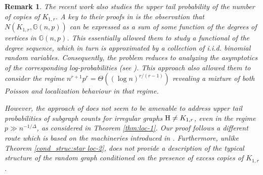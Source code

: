 \documentclass[a4paper,11pt,english,reqno]{amsart}
\numberwithin{equation}{section}
\renewcommand{\geq}{\geqslant}
\newcommand{\uH}{\textup{H}}
\newcommand{\G}{\mathbb{G}}
\newtheorem{theorem}{Theorem}[section]
\newtheorem{remark}[theorem]{Remark}
\newcommand{\blue}[1]{{\color{blue} #1}}
\newcommand{\purple}[1]{{\color{purple} #1}}
\begin{document}
	
	\begin{remark}
		The recent work \cite{AS25} also studies the upper tail probability of the number of copies of $K_{1,r}$.%
		 A key to their proofs in \cite{AS25} is the observation that $N(K_{1,r}, \G(n,p))$ can be expressed as a sum of some function of the degrees of vertices in $\G(n,p)$. This essentially allowed them to study a functional of the degree sequence, which in turn is approximated by a collection of i.i.d. binomial random variables. Consequently, the problem reduces to analyzing the asymptotics of the corresponding log-probabilities (see \cite[Lemma~4.2]{AS25}). This approach also allowed them to consider the regime $n^{r+1}p^r =\Theta ((\log n)^{r/(r-1)})$ revealing a mixture of both Poisson and localization behaviour in that regime.
		
		
		
		
		However, the approach of \cite{AS25} does not seem to be amenable to address upper tail probabilities of subgraph counts for irregular graphs $\uH \ne K_{1,r}$, even in the regime $p \gg n^{-1/\Delta}$, as considered in Theorem \ref{thm:loc-1}. 
		Our proof follows a different route which is based on the machineries introduced in \cite{HMS, ABRB}. Furthermore, unlike Theorem \ref{cond_struc:star loc-2}, \cite{AS25} does not provide a description of the typical structure of the random graph conditioned on the presence of excess copies of $K_{1,r}$.
		
	\end{remark}
\end{document}
